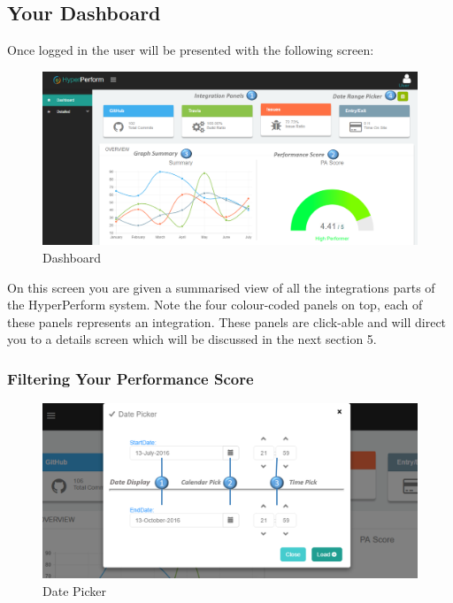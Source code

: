 \documentclass[11pt,a4paper]{article}
\begin{document}
\subsection{Your Dashboard}
Once logged in the user will be presented with the following screen:

\begin{figure}[H]
	\begin{center}
		\includegraphics[scale=0.27]{../Images/Getting_Started/dash_numbered.png}
		\caption{Dashboard}
	\end{center}
\end{figure}
\noindent
On this screen you are given a summarised view of all the integrations parts of the HyperPerform system. Note the four colour-coded panels on top, each of these panels represents an integration. These panels are click-able and will direct you to a details screen which will be discussed in the next section 5.

\subsubsection{Filtering Your Performance Score}
\begin{figure}[H]
	\begin{center}
		\includegraphics[scale=0.27]{../Images/Getting_Started/Date_Picker_Numbered}
		\caption{Date Picker}
	\end{center}
\end{figure}
\noindent
\end{document}

